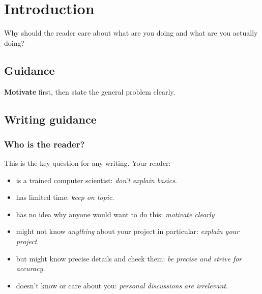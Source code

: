 \documentclass{l4proj}
\begin{document}


% 


% 



\chapter{Introduction}



Why should the reader care about what are you doing and what are you actually doing?
\section{Guidance}

\textbf{Motivate} first, then state the general problem clearly. 

\section{Writing guidance}
\subsection{Who is the reader?}

This is the key question for any writing. Your reader:

\begin{itemize}

\item
  is a trained computer scientist: \emph{don't explain basics}.
\item
  has limited time: \emph{keep on topic}.
\item
  has no idea why anyone would want to do this: \emph{motivate clearly}
\item
  might not know \emph{anything} about your project in particular:
  \emph{explain your project}.
\item
  but might know precise details and check them: \emph{be precise and
  strive for accuracy.}
\item
  doesn't know or care about you: \emph{personal discussions are
  irrelevant}.
\end{itemize}
\end{document}
